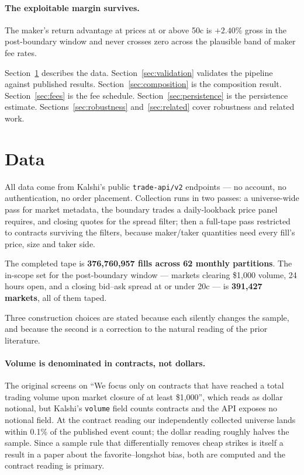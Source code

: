 \documentclass[preprint,12pt,authoryear]{elsarticle}
\begin{document}
\paragraph{The exploitable margin survives.} The maker's return advantage at
prices at or above 50c is $+2.40\%$ gross in the post-boundary window and never
crosses zero across the plausible band of maker fee rates.

Section~\ref{sec:data} describes the data. Section~\ref{sec:validation}
validates the pipeline against published results.
Section~\ref{sec:composition} is the composition result. Section~\ref{sec:fees}
is the fee schedule. Section~\ref{sec:persistence} is the persistence estimate.
Sections~\ref{sec:robustness} and~\ref{sec:related} cover robustness and related
work.

\section{Data}\label{sec:data}

All data come from Kalshi's public \texttt{trade-api/v2} endpoints --- no
account, no authentication, no order placement. Collection runs in two passes: a
universe-wide pass for market metadata, the boundary trades a daily-lookback
price panel requires, and closing quotes for the spread filter; then a full-tape
pass restricted to contracts surviving the filters, because maker/taker
quantities need every fill's price, size and taker side.

The completed tape is \textbf{376,760,957 fills across 62 monthly partitions}.
The in-scope set for the post-boundary window --- markets clearing \$1,000
volume, 24 hours open, and a closing bid--ask spread at or under 20c --- is
\textbf{391,427 markets}, all of them taped.

Three construction choices are stated because each silently changes the sample,
and because the second is a correction to the natural reading of the prior
literature.

\paragraph{Volume is denominated in contracts, not dollars.} The original screens
on ``We focus only on contracts that have reached a total trading volume upon
market closure of at least \$1,000'', which reads as dollar notional, but
Kalshi's \texttt{volume} field counts contracts and the API exposes no notional
field. At
the contract reading our independently collected universe lands within 0.1\% of
the published event count; the dollar reading roughly halves the sample. Since a
sample rule that differentially removes cheap strikes is itself a result in a
paper about the favorite--longshot bias, both are computed and the contract
reading is primary.
\end{document}
